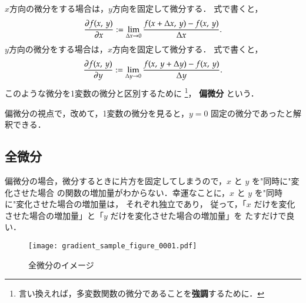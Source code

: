                 $x$方向の微分をする場合は，$y$方向を固定して微分する．
                式で書くと，
                        \begin{equation*}
                                \frac{\partial f(x,\,y)}{\partial x}
                                := \lim_{\Delta x \to 0} \frac{f(x+\Delta x,\,y)-f(x,\,y)}{\Delta x}.
                        \end{equation*}
                $y$方向の微分をする場合は，$x$方向を固定して微分する．
                式で書くと，
                        \begin{equation*}
                                \frac{\partial f(x,\,y)}{\partial y}
                                := \lim_{\Delta y \to 0} \frac{f(x,\,y+\Delta y)-f(x,\,y)}{\Delta y}.
                        \end{equation*}
                このような微分を1変数の微分と区別するために
                        \footnote{
                                言い換えれば，多変数関数の微分であることを\textbf{強調}するために．
                        }，
                \textbf{偏微分} という．

                偏微分の視点で，改めて，1変数の微分を見ると，$y=0$ 固定の微分であったと解釈できる．

            \subsection{全微分}
                偏微分の場合，微分するときに片方を固定してしまうので，$x$ と $y$ を"同時に"変化させた場合
                の関数の増加量がわからない．幸運なことに，$x$ と $y$ を"同時に"変化させた場合の増加量は，
                それぞれ独立であり，
                従って，「$x$ だけを変化させた場合の増加量」と「$y$ だけを変化させた場合の増加量」を
                たすだけで良い．
                \begin{figure}[hbt]
                    \begin{center}
                        \texttt{[image: gradient\_sample\_figure\_0001.pdf]}
                        \caption{全微分のイメージ}
                        \label{fig:gradient_sample_figure_0001}
                    \end{center}
                \end{figure}

